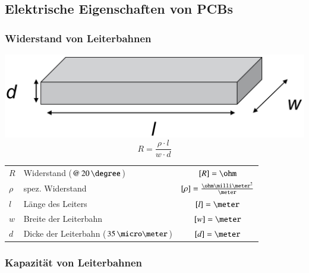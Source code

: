 \subsection{Elektrische Eigenschaften von PCBs}

\subsubsection{Widerstand von Leiterbahnen}

\begin{minipage}[t]{0.35\columnwidth}
    \includegraphics[width=\columnwidth]{images/leitung_widerstand.jpg}
    $$ \boxed{R = \frac{\rho \cdot l}{w \cdot d}} $$
\end{minipage}
\hfill
\begin{minipage}[t]{0.62\columnwidth}
    \begin{tabular}{llc}
        $R$     & Widerstand ($@ \, 20 \, \degree$)             & $[R] = \ohm$ \\
        $\rho$  & spez. Widerstand                              & $[\rho] = \frac{\ohm \milli \meter^2}{\meter}$ \\
        $l$     & Länge des Leiters                             & $[l] = \meter$ \\
        $w$     & Breite der Leiterbahn                         & $[w] = \meter$ \\
        $d$     & Dicke der Leiterbahn ($35 \, \micro \meter$)  & $[d] = \meter$ 
    \end{tabular}
\end{minipage}


\subsubsection{Kapazität von Leiterbahnen}

